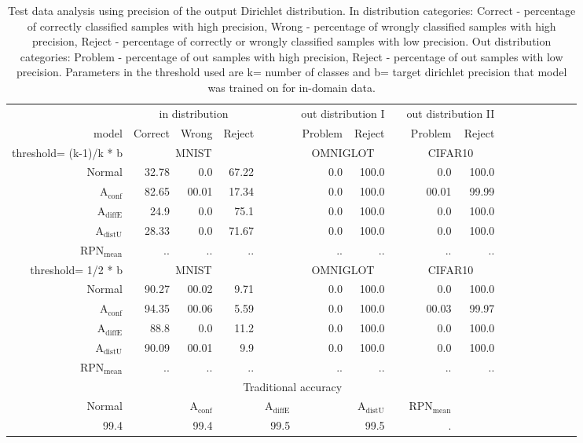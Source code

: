 \begin{table}[ht]
	\centering
	\caption{Test data analysis using precision of the output Dirichlet distribution. In distribution categories: Correct - percentage of correctly classified samples with high precision,
	Wrong - percentage of wrongly classified samples with high precision, Reject - percentage of correctly or wrongly classified samples with low precision. Out distribution categories:
	Problem - percentage of out samples with high precision, Reject - percentage of out samples with low precision. Parameters in the threshold used are k= number of classes and
	b= target dirichlet precision that model was trained on for in-domain data. }
	\begin{tiny}
        \begin{tabular}{@{}rrrrrrrcrrrrcrrrr@{}}
        \toprule
		& \multicolumn{3}{c}{in distribution} & & \multicolumn{2}{c}{out distribution I} & & \multicolumn{2}{c}{out distribution II} \\
		model & Correct & Wrong & Reject & &  Problem & Reject &  & Problem & Reject \\
        \midrule
		threshold= (k-1)/k * b & \multicolumn{3}{c}{MNIST} & & \multicolumn{2}{c}{OMNIGLOT} & & \multicolumn{2}{c}{CIFAR10} \\
		Normal & 32.78 & 0.0 & 67.22 & & 0.0 & 100.0 && 0.0 & 100.0 \\
		$\mathrm{A}_{\mathrm{conf}}$ & 82.65 & 00.01 & 17.34 && 0.0 & 100.0 && 00.01 & 99.99 \\
		$\mathrm{A}_{\mathrm{diffE}}$ & 24.9 & 0.0 & 75.1 & & 0.0 & 100.0 & & 0.0 & 100.0 \\  
		$\mathrm{A}_{\mathrm{distU}}$ & 28.33 & 0.0 & 71.67 & & 0.0 & 100.0 & & 0.0 & 100.0 \\
		$\mathrm{RPN}_{\mathrm{mean}}$ & .. & .. & .. & & .. & .. & & .. & .. \\
		\midrule
		threshold= 1/2 * b & \multicolumn{3}{c}{MNIST} & & \multicolumn{2}{c}{OMNIGLOT} & & \multicolumn{2}{c}{CIFAR10} \\
		Normal & 90.27 & 00.02 & 9.71 & & 0.0 & 100.0 && 0.0 & 100.0 \\
		$\mathrm{A}_{\mathrm{conf}}$ & 94.35 & 00.06 & 5.59 && 0.0 & 100.0 && 00.03 & 99.97 \\
		$\mathrm{A}_{\mathrm{diffE}}$ & 88.8 & 0.0 & 11.2 & & 0.0 & 100.0 & & 0.0 & 100.0 \\  
		$\mathrm{A}_{\mathrm{distU}}$ & 90.09 & 00.01 & 9.9 & & 0.0 & 100.0 & & 0.0 & 100.0 \\
		$\mathrm{RPN}_{\mathrm{mean}}$ & .. & .. & .. & & .. & .. & & .. & .. \\
		\midrule
		\toprule
		& \multicolumn{8}{c}{Traditional accuracy} \\
		Normal & & $\mathrm{A}_{\mathrm{conf}}$ & & $\mathrm{A}_{\mathrm{diffE}}$ & & $\mathrm{A}_{\mathrm{distU}}$ & & $\mathrm{RPN}_{\mathrm{mean}}$ \\
		99.4 & & 99.4 & & 99.5 & & 99.5 & & . \\

        \end{tabular}
	\end{tiny}
	\label{tab:precision based data analysis}
\end{table}




